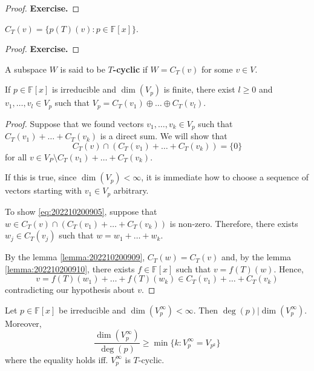 \begin{proof}
	\textbf{Exercise.}
\end{proof}

\begin{lemma}\label{lemma:202210200910}
	$C_T(v) = \{ p(T)(v) : p \in \mathbb{F}[x] \}$.
\end{lemma}

\begin{proof}
	\textbf{Exercise.}
\end{proof}

A subspace $W$ is said to be \textbf{$T$-cyclic} if $W = C_T(v)$ for some $v \in V$.

\begin{theorem}
	If $p \in \mathbb{F}[x]$ is irreducible and $\dim (V_p)$ is finite, there exist $l \geq 0$ and $v_1, \ldots, v_l \in V_p$ such that $V_p = C_T(v_1) \oplus \ldots \oplus C_T(v_l)$.
\end{theorem}

\begin{proof}
	Suppose that we found vectors $v_1, \ldots, v_k \in V_p$ such that $C_T(v_1) + \ldots + C_T(v_k)$ is a direct sum. We will show that 
	\begin{equation}\label{eq:202210200905}
		C_T(v) \cap (C_T(v_1) + \ldots + C_T(v_k)) = \{ 0 \}
	\end{equation}
	for all $v \in V_P \setminus C_T(v_1) + \ldots + C_T(v_k)$. 

	If this is true, since $\dim (V_p) < \infty$, it is immediate how to choose a sequence of vectors starting with $v_1 \in V_p$ arbitrary. 

	To show \eqref{eq:202210200905}, suppose that $w \in C_T(v) \cap (C_T(v_1) + \ldots + C_T(v_k))$ is non-zero. Therefore, there exists $w_j \in C_T(v_j)$ such that $w = w_1 + \ldots + w_k$.

	By the lemma \ref{lemma:202210200909}, $C_T(w) = C_T(v)$ and, by the lemma \ref{lemma:202210200910}, there exists $f \in \mathbb{F}[x]$ such that $v = f(T)(w)$. Hence,
	\[
		v = f(T)(w_1) + \ldots + f(T)(w_k) \in C_T(v_1) + \ldots + C_T(v_k)
	\]
	contradicting our hypothesis about $v$.
\end{proof}

\begin{theorem}
	Let $p \in \mathbb{F}[x]$ be irreducible and $\dim (V_p^\infty) < \infty$. Then $\deg(p) | \dim (V_p^\infty)$. Moreover,
	\[
		\frac{\dim (V_p^\infty)}{\deg(p)} \geq \min \{ k : V_p^\infty = V_{p^k} \}
	\]
	where the equality holds iff. $V_p^\infty$ is $T$-cyclic.
\end{theorem}


